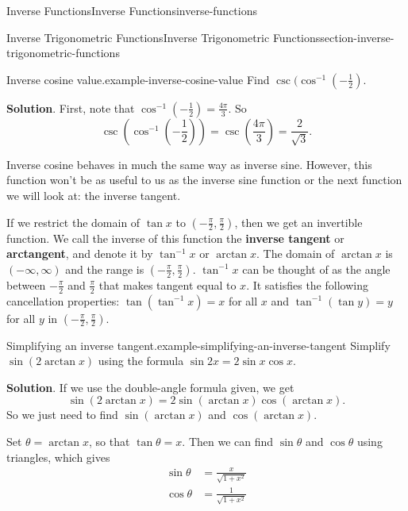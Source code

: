 \documentclass[oneside,10pt,]{book}
\newcommand{\terminology}[1]{\textbf{#1}}
\numberwithin{equation}{section}
\begin{document}
\begin{chapterptx}{Inverse Functions}{}{Inverse Functions}{}{}{inverse-functions}
\begin{sectionptx}{Inverse Trigonometric Functions}{}{Inverse Trigonometric Functions}{}{}{section-inverse-trigonometric-functions}
\begin{example}{Inverse cosine value.}{example-inverse-cosine-value}%
\hypertarget{p-269}{}%
Find \(\csc(\cos^{-1}(-\frac{1}{2})\).%
\par\smallskip%
\noindent\textbf{Solution}.\hypertarget{solution-58}{}\quad%
\hypertarget{p-270}{}%
First, note that \(\cos^{-1}(-\frac{1}{2}) = \frac{4\pi}{3}\). So%
\begin{equation*}
\csc(\cos^{-1}(-\frac{1}{2})) = \csc(\frac{4\pi}{3}) = \frac{2}{\sqrt{3}}.
\end{equation*}
%
\end{example}
\hypertarget{p-271}{}%
Inverse cosine behaves in much the same way as inverse sine. However, this function won't be as useful to us as the inverse sine function or the next function we will look at: the inverse tangent.%
\par
\hypertarget{p-272}{}%
If we restrict the domain of \(\tan x\) to \((-\frac{\pi}{2}, \frac{\pi}{2})\), then we get an  invertible function. We call the inverse of this function the \terminology{inverse tangent} or \terminology{arctangent}, and denote it by \(\tan^{-1}x\) or \(\arctan x\). The domain of \(\arctan x\) is \((-\infty,\infty)\) and the range is \((-\frac{\pi}{2},\frac{\pi}{2})\). \(\tan^{-1}x\) can be thought of as the angle between \(-\frac{\pi}{2}\) and \(\frac{\pi}{2}\) that makes tangent equal to \(x\). It satisfies the following cancellation properties: \(\tan(\tan^{-1}x) = x\) for all \(x\) and \(\tan^{-1}(\tan y) = y\) for all \(y\) in \((-\frac{\pi}{2},\frac{\pi}{2})\).%
\begin{example}{Simplifying an inverse tangent.}{example-simplifying-an-inverse-tangent}%
\hypertarget{p-273}{}%
Simplify \(\sin(2\arctan x)\) using the formula \(\sin2x = 2\sin x\cos x\).%
\par\smallskip%
\noindent\textbf{Solution}.\hypertarget{solution-59}{}\quad%
\hypertarget{p-274}{}%
If we use the double-angle formula given, we get%
\begin{equation*}
\sin(2\arctan x) = 2\sin(\arctan x)\cos(\arctan x).
\end{equation*}
So we just need to find \(\sin(\arctan x)\) and \(\cos(\arctan x)\).%
\par
\hypertarget{p-275}{}%
Set \(\theta = \arctan x\), so that \(\tan\theta = x\). Then we can find \(\sin\theta\) and \(\cos\theta\) using triangles, which gives%
\begin{align*}
\sin\theta & = \frac{x}{\sqrt{1+x^{2}}} \\
\cos\theta & = \frac{1}{\sqrt{1+x^{2}}} 

\end{align*}
\end{example}
\end{sectionptx}
\end{chapterptx}
\end{document}
